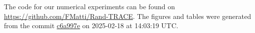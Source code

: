 The code for our numerical experiments can be found on \url{https://github.com/FMatti/Rand-TRACE}. The figures and tables were generated from the commit \href{https://github.com/FMatti/Rand-TRACE/tree/c6a997e}{c6a997e} on 2025-02-18 at 14:03:19 UTC.
